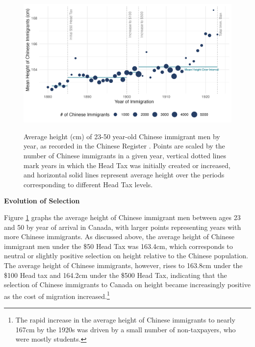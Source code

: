 

\vspace{2mm}


\begin{figure}[!h]
    \centering 
    \caption{Average height (cm) of 23-50 year-old Chinese immigrant men by year, as recorded in the Chinese Register \citep{chineseregister}. Points are scaled by the number of Chinese immigrants in a given year, vertical dotted lines mark years in which the Head Tax was initially created or increased, and horizontal solid lines represent average height over the periods corresponding to different Head Tax levels.}
    \includegraphics[width=\textwidth]{../../figs/height_selection.png}
    \label{fig:height_selection}
\end{figure}

\noindent \textbf{Evolution of Selection} \par 
Figure \ref{fig:height_selection} graphs the average height of Chinese immigrant men between ages 23 and 50 by year of arrival in Canada, with larger points representing years with more Chinese immigrants. As discussed above, the average height of Chinese immigrant men under the \$50 Head Tax was 163.4cm, which corresponds to neutral or slightly positive selection on height relative to the Chinese population. The average height of Chinese immigrants, however, rises to 163.8cm under the \$100 Head tax and 164.2cm under the \$500 Head Tax, indicating that the selection of Chinese immigrants to Canada on height became increasingly positive as the cost of migration increased.\footnote{The rapid increase in the average height of Chinese immigrants to nearly 167cm by the 1920s was driven by a small number of non-taxpayers, who were mostly students.}

